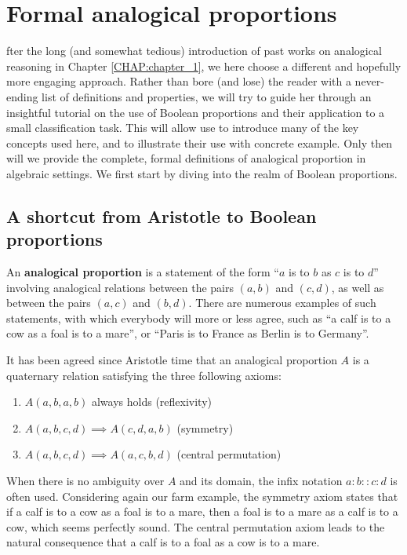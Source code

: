 \chapter{Formal analogical proportions}

fter the long (and somewhat tedious) introduction of past works on analogical
reasoning in Chapter \ref{CHAP:chapter_1}, we here choose a different and
hopefully more engaging approach. Rather than bore (and lose) the reader with a
never-ending list of definitions and properties, we will try to guide her
through an insightful tutorial on the use of Boolean proportions and their
application to a small classification task. This will allow use to introduce
many of the key concepts used here, and to illustrate their use with concrete
example. Only then will we provide the complete, formal definitions of
analogical proportion in algebraic settings. We first start by diving into the
realm of Boolean proportions.

\section{A shortcut from Aristotle to Boolean proportions}
\label{SEC:shortcut_from_aristotle_to_boolean_proportions}

An \textbf{analogical proportion} is a statement of the form ``$a$ is to $b$ as
$c$ is to $d$'' involving analogical relations between the pairs $(a,b)$ and
$(c,d)$, as well as between the pairs $(a,c)$ and $(b,d)$.  There are numerous
examples of such statements, with which everybody will more or less agree, such
as  ``a calf is to a cow as a foal is to a mare'', or ``Paris is to France as
Berlin is to Germany''.

It has been agreed since Aristotle time that an analogical proportion $A$ is a
quaternary relation satisfying the three following axioms:

\begin{enumerate}
\item $A(a,b,a,b)$ always holds (reflexivity)
\item $A(a,b,c,d) \implies A(c,d,a,b)$ (symmetry)
\item $A(a,b,c,d) \implies A(a,c,b,d)$ (central permutation)
\end{enumerate}

When there is no ambiguity over $A$ and its domain, the infix notation
$a:b::c:d$ is often used. Considering again our farm example, the symmetry
axiom states that if a calf is to a cow as a foal is to a mare, then a foal is
to a mare as a calf is to a cow, which seems perfectly sound. The central
permutation axiom leads to the natural consequence that a calf is to a foal as
a cow is to a mare.

